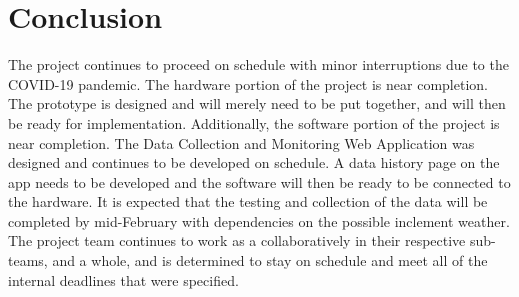 \section{Conclusion}
The project continues to proceed on schedule with minor interruptions due to the COVID-19 pandemic. The hardware portion of the project is near completion. The prototype is designed and will merely need to be put together, and will then be ready for implementation. Additionally, the software portion of the project is near completion. The Data Collection and Monitoring Web Application was designed and continues to be developed on schedule. A data history page on the app needs to be developed and the software will then be ready to be connected to the hardware. It is expected that the testing and collection of the data will be completed by mid-February with dependencies on the possible inclement weather. The project team continues to work as a collaboratively in their respective sub-teams, and a whole, and is determined to stay on schedule and meet all of the internal deadlines that were specified.